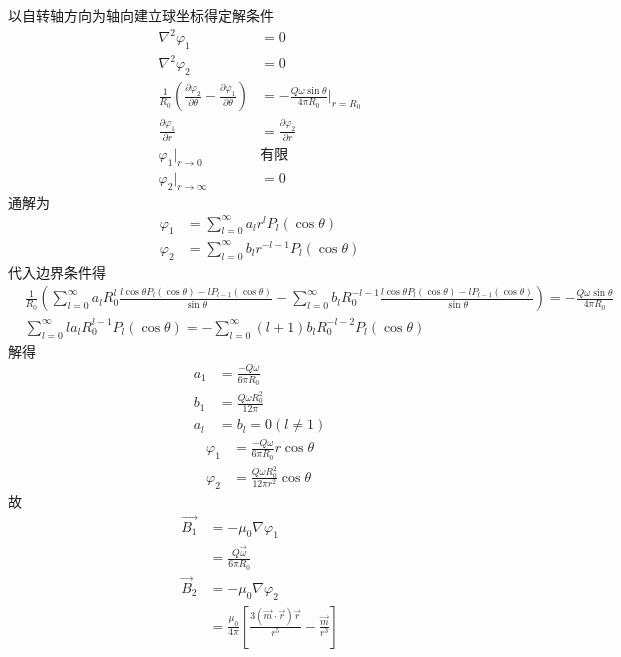 \documentclass{phyasgn}
\begin{document}
\begin{sol}[1]
    以自转轴方向为轴向建立球坐标得定解条件
    \begin{align*}
        \nabla^2\varphi_1&=0\\
        \nabla^2\varphi_2&=0\\
        \frac{1}{R_0}\left(\frac{\partial\varphi_2}{\partial\theta}-\frac{\partial\varphi_1}{\partial\theta}\right)&  =-\frac{Q\omega\sin\theta}{4\pi R_0}|_{r=R_0}\\
        \frac{\partial\varphi_1}{\partial r}&=\frac{\partial \varphi_2}{\partial r}\\
        \varphi_1|_{r\to0}&\text{有限}\\
        \varphi_2|_{r\to\infty}&=0
    \end{align*}
    通解为
    \begin{align*}
        \varphi_1&=\sum_{l=0}^{\infty}a_lr^lP_l(\cos\theta)\\
        \varphi_2&=\sum_{l=0}^{\infty}b_lr^{-l-1}P_l(\cos\theta)
    \end{align*}
    代入边界条件得
    \begin{align*}
        &\frac{1}{R_0}(\sum_{l=0}^{\infty}a_lR_0^l\frac{l\cos\theta P_l(\cos\theta)-lP_{l-1}(\cos\theta)}{\sin\theta}-\sum_{l=0}^{\infty}b_lR_0^{-l-1}\frac{l\cos\theta P_l(\cos\theta)-lP_{l-1}(\cos\theta)}{\sin\theta}) =-\frac{Q\omega\sin\theta}{4\pi R_0}\\
        &\sum_{l=0}^{\infty}la_lR_0^{l-1}P_l(\cos\theta)=-\sum_{l=0}^{\infty}(l+1)b_lR_0^{-l-2}P_l(\cos\theta)
    \end{align*}
    解得
    \begin{align*}
        a_1&=\frac{-Q\omega}{6\pi R_0}\\
        b_1&=\frac{Q\omega R_0^2}{12\pi}\\
        a_l&=b_l=0(l\neq1)
    \end{align*}
    \begin{align*}
        \varphi_1&=\frac{-Q\omega}{6\pi R_0}r\cos\theta\\
        \varphi_2&=\frac{Q\omega R_0^2}{12\pi r^2}\cos\theta
    \end{align*}
    故
    \begin{align*}
        \vec{B_1}&=-\mu_0\nabla\varphi_1\\
        &=\frac{Q\vec{\omega}}{6\pi R_0}\\
        \vec{B}_2&=-\mu_0\nabla\varphi_2\\
        &=\frac{\mu_0}{4\pi}\left[\frac{3(\vec{m}\cdot\vec{r})\vec{r}}{r^5}-\frac{\vec{m}}{r^3}\right]
    \end{align*}
\end{sol}
\end{document}

